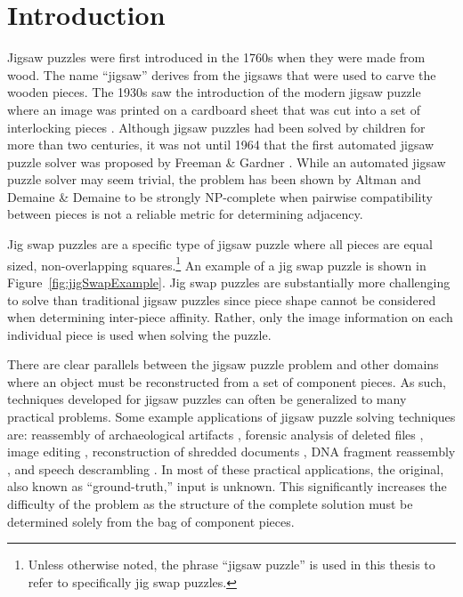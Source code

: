 \chapter{Introduction}\label{sec:introduction}

Jigsaw puzzles were first introduced in the 1760s when they were made from wood.  The name ``jigsaw'' derives from the jigsaws that were used to carve the wooden pieces.   The 1930s saw the introduction of the modern jigsaw puzzle where an image was printed on a cardboard sheet that was cut into a set of interlocking pieces \cite{williams1990, williams2004}.  Although jigsaw puzzles had been solved by children for more than two centuries, it was not until 1964 that the first automated jigsaw puzzle solver was proposed by Freeman \& Gardner \cite{freeman1964}.  While an automated jigsaw puzzle solver may seem trivial, the problem has been shown by Altman \cite{altman1990} and Demaine \& Demaine \cite{demaine2007} to be strongly NP-complete when pairwise compatibility between pieces is not a reliable metric for determining adjacency.

Jig swap puzzles are a specific type of jigsaw puzzle where all pieces are equal sized, non-overlapping squares.\footnote{Unless otherwise noted, the phrase ``jigsaw puzzle'' is used in this thesis to refer to specifically jig swap puzzles.}  An example of a jig swap puzzle is shown in Figure~\ref{fig:jigSwapExample}.  Jig swap puzzles are substantially more challenging to solve than traditional jigsaw puzzles since piece shape cannot be considered when determining inter-piece affinity.  Rather, only the image information on each individual piece is used when solving the puzzle.

There are clear parallels between the jigsaw puzzle problem and other domains where an object must be reconstructed from a set of component pieces.  As such, techniques developed for jigsaw puzzles can often be generalized to many practical problems.  Some example applications of jigsaw puzzle solving techniques are: reassembly of archaeological artifacts \cite{brown2008, koller2006}, forensic analysis of deleted files \cite{garfinkel2010}, image editing \cite{cho2008}, reconstruction of shredded documents \cite{zhu2008}, DNA fragment reassembly \cite{marande2007}, and speech descrambling \cite{zhao2007}.  In most of these practical applications, the original, also known as ``ground-truth,'' input is unknown.  This significantly increases the difficulty of the problem as the structure of the complete solution must be determined solely from the bag of component pieces.

